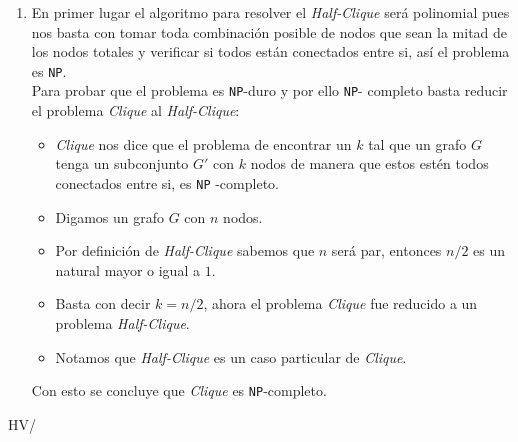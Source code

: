 \documentclass[spanish, fleqn]{article}
\begin{document}
\begin{enumerate}
	\item
		En primer lugar el algoritmo para resolver el \emph{Half-Clique} será
		polinomial pues nos basta con tomar toda combinación posible de nodos
		que sean la mitad de los nodos totales y verificar si todos están 
		conectados entre si, así el problema es \texttt{NP}.\\
		Para probar que el problema es \texttt{NP}-duro y por ello \texttt{NP}-
		completo basta reducir el problema \emph{Clique} al \emph{Half-Clique}:
		\begin{itemize}
			\item
				\emph{Clique} nos dice que el problema de encontrar un $k$ tal
				que un grafo $G$ tenga un  subconjunto $G'$ con $k$ nodos de
				manera que estos estén todos conectados entre si, es \texttt{NP}
				-completo.
			\item
				Digamos un grafo $G$ con $n$ nodos.
			\item
				Por definición de \emph{Half-Clique} sabemos que $n$ será par,
				entonces $n/2$ es un natural mayor o igual a $1$.
			\item
				Basta con decir $k=n/2$, ahora el problema \emph{Clique} fue
				reducido a un problema \emph{Half-Clique}.
			\item
				Notamos que \emph{Half-Clique} es un caso particular de
				\emph{Clique}.
		\end{itemize}
		Con esto se concluye que \emph{Clique} es \texttt{NP}-completo.

\end{enumerate}
\vfill\hfill HV/\LaTeXe
\end{document}
